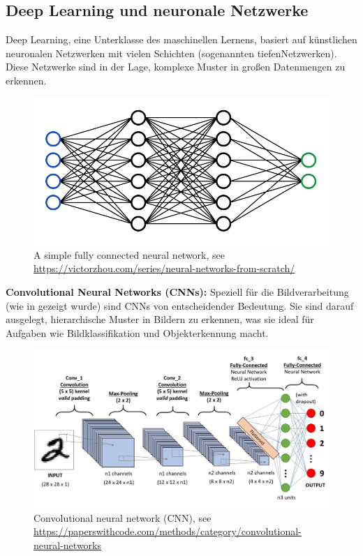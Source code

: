 \documentclass[nolibertine, ngerman, algorithm, nomencl, minted]{ttlab-qualify}
\begin{document}
\subsection{Deep Learning und neuronale Netzwerke}

Deep Learning, eine Unterklasse des maschinellen Lernens, basiert auf künstlichen neuronalen Netzwerken mit vielen Schichten (sogenannten \glqq tiefen\grqq Netzwerken). Diese Netzwerke sind in der Lage, komplexe Muster in großen Datenmengen zu erkennen.

\begin{figure}[h]
	\centering
	\includegraphics[scale=0.4]{static/FCnetwork.png}
	\caption{A simple fully connected neural network, see \url{https://victorzhou.com/series/neural-networks-from-scratch/}}
	\label{fig:2.1}
\end{figure}

\textbf{Convolutional Neural Networks (CNNs):} Speziell für die Bildverarbeitung (wie in \cite{oshea2015introduction} gezeigt wurde) sind CNNs von entscheidender Bedeutung. Sie sind darauf ausgelegt, hierarchische Muster in Bildern zu erkennen, was sie ideal für Aufgaben wie Bildklassifikation und Objekterkennung macht.
\begin{figure}[h]
	\centering
	\includegraphics[scale=0.2]{static/cnn.jpeg}
	\caption{Convolutional neural network (CNN), see \url{https://paperswithcode.com/methods/category/convolutional-neural-networks}}
	\label{fig:2.2}
\end{figure}
\end{document}
